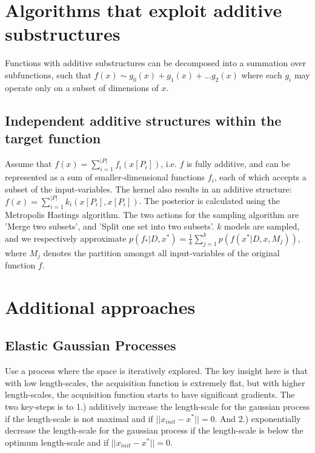 \documentclass[a4paper,12pt,twoside,openright]{report}
\begin{document}
\section{Algorithms that exploit additive substructures}

Functions with additive substructures can be decomposed into a summation over subfunctions, such that
$ f(x) \sim g_0(x) + g_1(x) + \ldots g_2(x) $ where each $g_i$ may operate only on a subset of dimensions of $x$.

\subsection{Independent additive structures within the target function}

\citep{Gardner2017} Assume that $f(x) = \sum_{i=1}^{ |P| } f_i (x[P_i] )$, i.e. $f$ is fully additive, and can be represented as a sum of smaller-dimensional functions $f_i$, each of which accepts a subset of the input-variables.
The kernel also results in an additive structure: $f(x) = \sum_{i=1}^{ |P| } k_i (x[P_i], x[P_i])$.
The posterior is calculated using the Metropolis Hastings algorithm.
The two actions for the sampling algorithm are 'Merge two subsets', and 'Split one set into two subsets'.
$k$ models are sampled, and we respectively approximate $p(f_* | D, x^*) = \frac{1}{k} \sum_{j=1}^{k} p( f(x^* | D, x, M_j) )$, where $M_j$ denotes the partition amongst all input-variables of the original function $f$.

\section{Additional approaches}

\subsection{Elastic Gaussian Processes}

\citep{Rana2017} Use a process where the space is iteratively explored.
The key insight here is that with low length-scales, the acquisition function is extremely flat, but with higher length-scales, the acquisition function starts to have significant gradients.
The two key-steps is to 1.) additively increase the length-scale for the gaussian process if the length-scale is not maximal and if $|| x_{init} - x^* || = 0$.
And 2.) exponentially decrease the length-scale for the gaussian process if the length-scale is below the optimum length-scale and if $|| x_{init} - x^* || = 0$.
\end{document}
